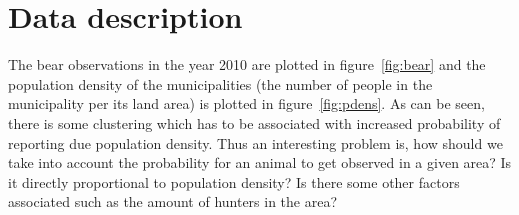 \documentclass[12pt,a4paper,oneside,article]{memoir}
\author{Ville Väänänen}
\begin{document}
\mytitlepage

\section{Data description}

The bear observations in the year 2010 are plotted in figure~\ref{fig:bear}
and the population density of the municipalities (the number of people
in the municipality per its land area) is plotted in figure~\ref{fig:pdens}. 
As can be seen, there is some clustering which has to be associated with increased
probability of reporting due population density. Thus an interesting problem is,
how should we take into account the probability for an animal to get observed
in a given area? Is it directly proportional to population density? Is there some
other factors associated such as the amount of hunters in the area?
\end{document}
